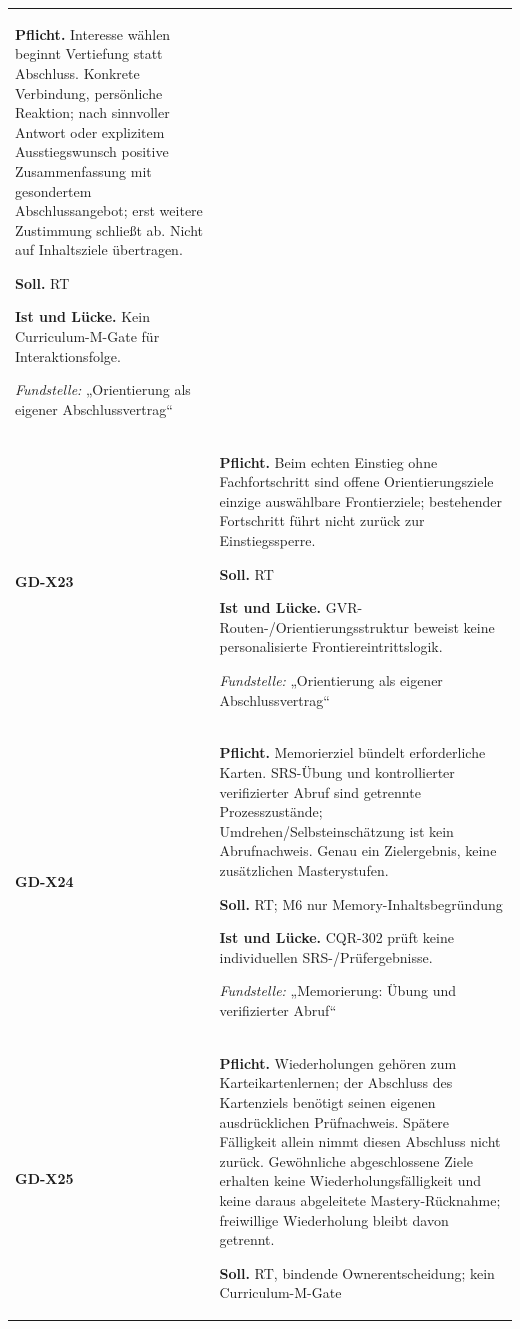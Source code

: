 \begin{longtable}{@{}P{20mm}P{128mm}@{}}
\textbf{Pflicht.} Interesse wählen beginnt Vertiefung statt Abschluss. Konkrete Verbindung, persönliche Reaktion; nach sinnvoller Antwort oder explizitem Ausstiegswunsch positive Zusammenfassung mit gesondertem Abschlussangebot; erst weitere Zustimmung schließt ab. Nicht auf Inhaltsziele übertragen.\par\smallskip
\textbf{Soll.} RT\par\smallskip
\textbf{Ist und Lücke.} Kein Curriculum-M-Gate für Interaktionsfolge.\par\smallskip
\emph{Fundstelle:} „Orientierung als eigener Abschlussvertrag“\\\addlinespace[5pt]
\label{rule:GD-X23}\textbf{GD-X23} &
\textbf{Pflicht.} Beim echten Einstieg ohne Fachfortschritt sind offene Orientierungsziele einzige auswählbare Frontierziele; bestehender Fortschritt führt nicht zurück zur Einstiegssperre.\par\smallskip
\textbf{Soll.} RT\par\smallskip
\textbf{Ist und Lücke.} GVR-Routen-/Orientierungsstruktur beweist keine personalisierte Frontiereintrittslogik.\par\smallskip
\emph{Fundstelle:} „Orientierung als eigener Abschlussvertrag“\\\addlinespace[5pt]
\label{rule:GD-X24}\textbf{GD-X24} &
\textbf{Pflicht.} Memorierziel bündelt erforderliche Karten. SRS-Übung und kontrollierter verifizierter Abruf sind getrennte Prozesszustände; Umdrehen/Selbsteinschätzung ist kein Abrufnachweis. Genau ein Zielergebnis, keine zusätzlichen Masterystufen.\par\smallskip
\textbf{Soll.} RT; M6 nur Memory-Inhaltsbegründung\par\smallskip
\textbf{Ist und Lücke.} CQR-302 prüft keine individuellen SRS-/Prüfergebnisse.\par\smallskip
\emph{Fundstelle:} „Memorierung: Übung und verifizierter Abruf“\\\addlinespace[5pt]
\label{rule:GD-X25}\textbf{GD-X25} &
\textbf{Pflicht.} Wiederholungen gehören zum Karteikartenlernen; der Abschluss des Kartenziels benötigt seinen eigenen ausdrücklichen Prüfnachweis. Spätere Fälligkeit allein nimmt diesen Abschluss nicht zurück. Gewöhnliche abgeschlossene Ziele erhalten keine Wiederholungsfälligkeit und keine daraus abgeleitete Mastery-Rücknahme; freiwillige Wiederholung bleibt davon getrennt.\par\smallskip
\textbf{Soll.} RT, bindende Ownerentscheidung; kein Curriculum-M-Gate\par\smallskip

\end{longtable}
